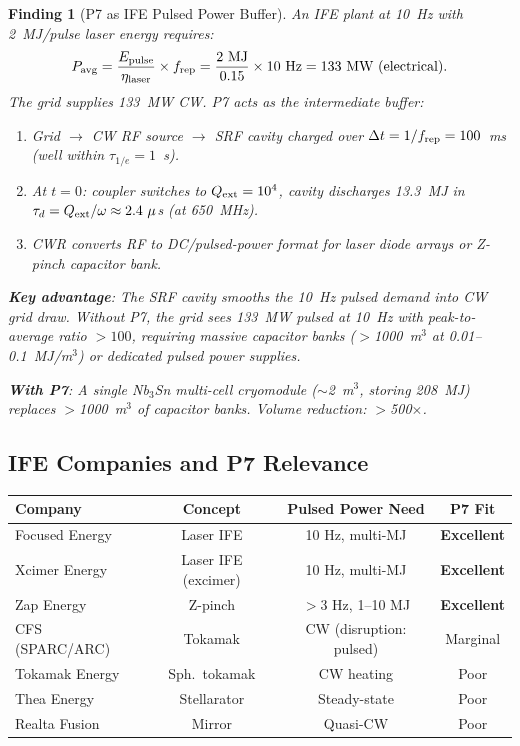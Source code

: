 \documentclass[11pt]{article}
\newtheorem{finding}{Finding}
\begin{document}
\begin{finding}[P7 as IFE Pulsed Power Buffer]
\label{find:ife-buffer}
An IFE plant at 10~Hz with 2~MJ/pulse laser energy requires:
\begin{equation}
P_{\rm avg} = \frac{E_{\rm pulse}}{\eta_{\rm laser}} \times f_{\rm rep}
= \frac{2~\text{MJ}}{0.15} \times 10~\text{Hz} = 133~\text{MW (electrical)}.
\end{equation}
The grid supplies 133~MW CW. P7 acts as the intermediate buffer:
\begin{enumerate}[nosep]
  \item Grid $\to$ CW RF source $\to$ SRF cavity charged over
    $\Delta t = 1/f_{\rm rep} = 100$~ms (well within $\tau_{1/e} = 1$~s).
  \item At $t = 0$: coupler switches to $Q_{\rm ext} = 10^4$,
    cavity discharges 13.3~MJ in $\tau_d = Q_{\rm ext}/\omega
    \approx 2.4~\mu$s (at 650~MHz).
  \item CWR converts RF to DC/pulsed-power format for laser
    diode arrays or Z-pinch capacitor bank.
\end{enumerate}

\textbf{Key advantage}: The SRF cavity smooths the 10~Hz pulsed
demand into CW grid draw. Without P7, the grid sees 133~MW
pulsed at 10~Hz with peak-to-average ratio $>100$, requiring
massive capacitor banks ($>$1000~m$^3$ at 0.01--0.1~MJ/m$^3$)
or dedicated pulsed power supplies.

\textbf{With P7}: A single Nb$_3$Sn multi-cell cryomodule
($\sim$2~m$^3$, storing 208~MJ) replaces $>$1000~m$^3$ of
capacitor banks. Volume reduction: $>$500$\times$.
\end{finding}

\subsection{IFE Companies and P7 Relevance}

\begin{center}
\begin{tabular}{lccc}
\toprule
Company & Concept & Pulsed Power Need & P7 Fit \\
\midrule
Focused Energy & Laser IFE & 10 Hz, multi-MJ & \textbf{Excellent} \\
Xcimer Energy & Laser IFE (excimer) & 10 Hz, multi-MJ & \textbf{Excellent} \\
Zap Energy & Z-pinch & $>$3 Hz, 1--10 MJ & \textbf{Excellent} \\
CFS (SPARC/ARC) & Tokamak & CW (disruption: pulsed) & Marginal \\
Tokamak Energy & Sph.\ tokamak & CW heating & Poor \\
Thea Energy & Stellarator & Steady-state & Poor \\
Realta Fusion & Mirror & Quasi-CW & Poor \\
\bottomrule
\end{tabular}
\end{center}
\end{document}
